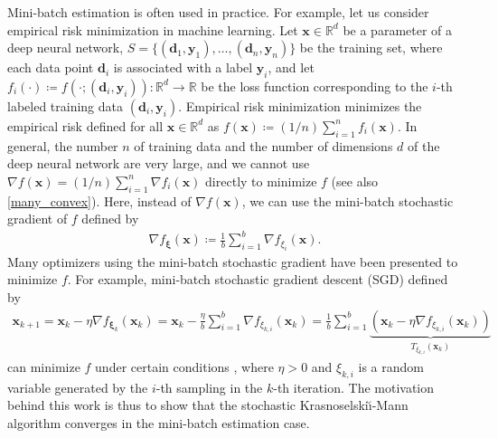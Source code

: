 \documentclass[smallextended,referee,envcountsect,]{svjour3}
\begin{document}
Mini-batch estimation is often used in practice. For example, let us consider empirical risk minimization in machine learning. Let $\bm{x} \in \mathbb{R}^{d}$ be a parameter of a deep neural network, $S = \{(\bm{d}_1,\bm{y}_1), \ldots, (\bm{d}_n,\bm{y}_n)\}$ be the training set, where each data point $\bm{d}_i$ is associated with a label $\bm{y}_i$, and let $f_i (\cdot) \coloneqq f(\cdot;(\bm{d}_i,\bm{y}_i)) \colon \mathbb{R}^{d} \to \mathbb{R}$ be the loss function corresponding to the $i$-th labeled training data $(\bm{d}_i,\bm{y}_i)$. Empirical risk minimization minimizes the empirical risk defined for all $\bm{x} \in \mathbb{R}^{d}$ as $f (\bm{x}) \coloneqq (1/n) \sum_{i=1}^n f_i(\bm{x})$. In general, the number $n$ of training data and the number of dimensions $d$ of the deep neural network are very large, and we cannot use $\nabla f(\bm{x}) = (1/n) \sum_{i=1}^n \nabla f_i(\bm{x})$ directly to minimize $f$ (see also \eqref{many_convex}). Here, instead of $\nabla f (\bm{x})$, we can use the mini-batch stochastic gradient of $f$ defined by 
\begin{align*}
\nabla f_{\bm{\xi}} (\bm{x}) \coloneqq \frac{1}{b} \sum_{i=1}^b \nabla f_{\xi_i} (\bm{x}).
\end{align*}
Many optimizers using the mini-batch stochastic gradient have been presented to minimize $f$. For example, mini-batch stochastic gradient descent (SGD) defined by 
\begin{align*}
\bm{x}_{k+1} 
= \bm{x}_k - \eta \nabla f_{\bm{\xi}_k} (\bm{x}_k)
= \bm{x}_k - \frac{\eta}{b} \sum_{i=1}^b \nabla f_{\xi_{k,i}} (\bm{x}_k)
= \frac{1}{b} \sum_{i=1}^b \underbrace{\left( \bm{x}_k - \eta \nabla f_{\xi_{k,i}} (\bm{x}_k)   \right)}_{T_{\xi_{k,i}} (\bm{x}_k)}
\end{align*}
can minimize $f$ under certain conditions \cite[Section 5]{garrigos2024handbookconvergencetheoremsstochastic}, where $\eta > 0$ and $\xi_{k,i}$ is a random variable generated by the $i$-th sampling in the $k$-th iteration. The motivation behind this work is thus to show that the stochastic Krasnoselski\u\i-Mann algorithm converges in the mini-batch estimation case.
\end{document}
